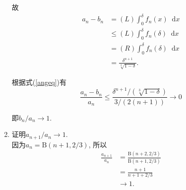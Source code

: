 \documentclass[a4paper,12pt]{ctexart}
\newcommand*\diff{\mathop{}\!\mathrm{d}}
\newcommand*\Beta{\mathrm{B}}
\begin{document}
\begin{solution}
\begin{enumerate}[Step i.]
            故
            \begin{equation}
            \begin{aligned}
                a_n-b_n
                &=(L)\int_{0}^{\delta}{f_n(x)\diff x}\\
                &\leq (L)\int_{0}^{\delta}{f_n(\delta)\diff x}\\
                &= (R)\int_{0}^{\delta}{f_n(\delta)\diff x}\\
                &=\frac{\delta^{n+1}}{\sqrt[3]{1-\delta}}.
            \end{aligned}
            \end{equation}

            根据式(\ref{angeq})有
            \begin{equation}
                \frac{a_n-b_n}{a_n}
                \leq\frac{\delta^{n+1}/(\sqrt[3]{1-\delta})}{3/(2(n+1))}
                \to 0
            \end{equation}

            即$b_n/a_n\to 1$.
        \item 证明$a_{n+1}/a_n\to 1$.\\
            因为$a_n=\Beta(n+1, 2/3)$, 所以
            \begin{equation}
            \begin{aligned}
                \frac{a_{n+1}}{a_n}
                &= \frac{\Beta(n+2, 2/3)}{\Beta(n+1, 2/3)}\\
                &= \frac{n+1}{n+1+2/3}\\
                &\to 1.
            \end{aligned}
            \end{equation}
        \end{enumerate}
    \end{solution}
\end{document}
